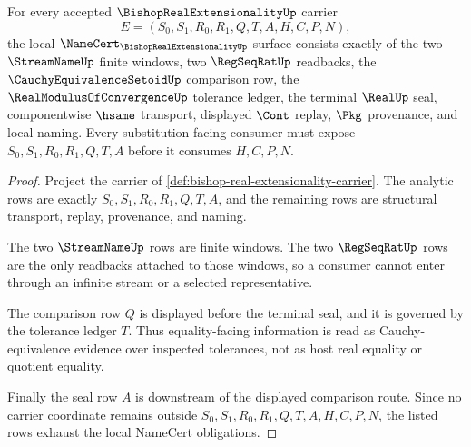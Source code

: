 \begin{theorem}
\label{thm:bishop-real-extensionality-namecert-obligations}
For every accepted $\BishopRealExtensionalityUp$ carrier
$$
E=(S_0,S_1,R_0,R_1,Q,T,A,H,C,P,N),
$$
the local $\NameCert_{\BishopRealExtensionalityUp}$ surface consists exactly of the two $\StreamNameUp$ finite windows, two $\RegSeqRatUp$ readbacks, the $\CauchyEquivalenceSetoidUp$ comparison row, the $\RealModulusOfConvergenceUp$ tolerance ledger, the terminal $\RealUp$ seal, componentwise $\hsame$ transport, displayed $\Cont$ replay, $\Pkg$ provenance, and local naming. Every substitution-facing consumer must expose $S_0,S_1,R_0,R_1,Q,T,A$ before it consumes $H,C,P,N$.
\end{theorem}
\begin{proof}
Project the carrier of \autoref{def:bishop-real-extensionality-carrier}. The analytic rows are exactly $S_0,S_1,R_0,R_1,Q,T,A$, and the remaining rows are structural transport, replay, provenance, and naming.

The two $\StreamNameUp$ rows are finite windows. The two $\RegSeqRatUp$ rows are the only readbacks attached to those windows, so a consumer cannot enter through an infinite stream or a selected representative.

The comparison row $Q$ is displayed before the terminal seal, and it is governed by the tolerance ledger $T$. Thus equality-facing information is read as Cauchy-equivalence evidence over inspected tolerances, not as host real equality or quotient equality.

Finally the seal row $A$ is downstream of the displayed comparison route. Since no carrier coordinate remains outside $S_0,S_1,R_0,R_1,Q,T,A,H,C,P,N$, the listed rows exhaust the local NameCert obligations.
\end{proof}

